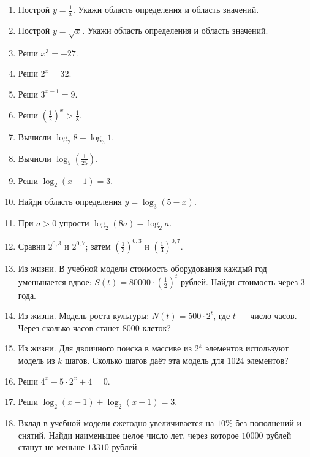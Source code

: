 \documentclass[12pt,a4paper]{article}
\theoremstyle{definition}
\theoremstyle{plain}
\theoremstyle{remark}
\newcommand{\starmark}{\ensuremath{{}^{\ast}}}
\begin{document}
\begin{enumerate}[label=\thesection.\arabic*.,leftmargin=2.8em,itemsep=12pt]
\item Построй \(y = \frac{1}{x}\). Укажи область определения и область значений.
\item Построй \(y = \sqrt{x}\). Укажи область определения и область значений.
\item Реши \(x^{3} = - 27\).
\item Реши \(2^{x} = 32\).
\item Реши \(3^{x - 1} = 9\).
\item Реши \((\frac{1}{2})^{x} > \frac{1}{8}\).
\item Вычисли \(\log _{2} 8 + \log _{3} 1\).
\item Вычисли \(\log _{5} (\frac{1}{25})\).
\item Реши \(\log _{2} (x - 1) = 3\).
\item Найди область определения \(y = \log _{3} (5 - x)\).
\item При \(a > 0\) упрости \(\log _{2} (8 a) - \log _{2} a\).
\item Сравни \(2^{0{,}3}\) и \(2^{0{,}7}\); затем \((\frac{1}{3})^{0{,}3}\) и \((\frac{1}{3})^{0{,}7}\).
\item Из жизни. В учебной модели стоимость оборудования каждый год уменьшается вдвое: \(S (t) = 80000 \cdot  (\frac{1}{2})^{t}\) рублей. Найди стоимость через \(3\) года.
\item Из жизни. Модель роста культуры: \(N (t) = 500 \cdot  2^{t}\), где \(t\) — число часов. Через сколько часов станет \(8000\) клеток?
\item Из жизни. Для двоичного поиска в массиве из \(2^{k}\) элементов используют модель из \(k\) шагов. Сколько шагов даёт эта модель для \(1024\) элементов?
\item[\textbf{12.16.}\starmark] Реши \(4^{x} - 5 \cdot  2^{x} + 4 = 0\).
\item[\textbf{12.17.}\starmark] Реши \(\log _{2} (x - 1) + \log _{2} (x + 1) = 3\).
\item[\textbf{12.18.}\starmark] Вклад в учебной модели ежегодно увеличивается на \(10 \%\) без пополнений и снятий. Найди наименьшее целое число лет, через которое \(10000\) рублей станут не меньше \(13310\) рублей.
\end{enumerate}
\clearpage
\end{document}
